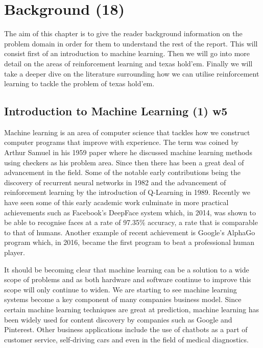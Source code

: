 \chapter{Background (18)}
\label{ch:background}

The aim of this chapter is to give the reader background information on the problem domain in order for them
to understand the rest of the report.
This will consist first of an introduction to machine learning.
Then we will go into more detail on the areas of reinforcement learning and texas hold'em.
Finally we will take a deeper dive on the literature surrounding how we can utilise reinforcement learning
to tackle the problem of texas hold'em.

\section{Introduction to Machine Learning (1) w5}\label{sec:introductionToMachineLearning}

Machine learning is an area of computer science that tackles how we construct computer programs that improve
with experience\cite{mitchell1997machine}.
The term was coined by Arthur Samuel in his 1959 paper where he discussed machine learning methods using
checkers as his problem area.
Since then there has been a great deal of advancement in the field.
Some of the notable early contributions being the discovery of recurrent neural networks in 1982 and
the advancement of reinforcement learning by the introduction of Q-Learning in 1989.
Recently we have seen some of this early academic work culminate in more practical achievements such as
Facebook's DeepFace system which, in 2014,  was shown to be able to recognise faces at a rate of 97.35\% accuracy,
a rate that is comparable to that of humans.
Another example of recent achievement is Google's AlphaGo program which, in 2016, became the first program to beat
a professional human player.

It should be becoming clear that machine learning can be a solution to a wide scope of problems and as
both hardware and software continue to improve this scope will only continue to widen.
We are starting to see machine learning systems become a key component of many companies business model.
Since certain machine learning techniques are great at prediction, machine learning has been widely used
for content discovery by companies such as Google and Pinterest.
Other business applications include the use of chatbots as a part of customer service, self-driving cars
and even in the field of medical diagnostics.

